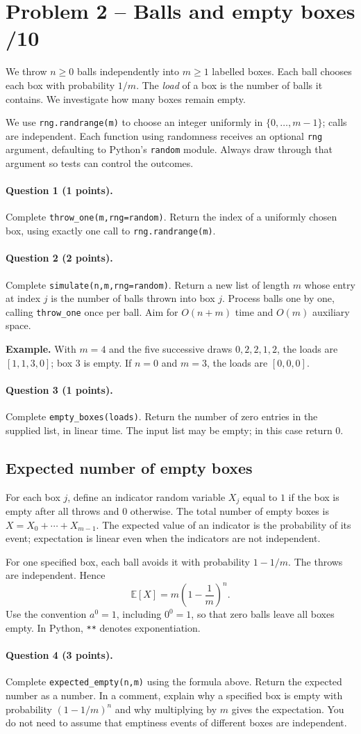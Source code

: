 \documentclass[11pt,a4paper]{article}
\newcommand{\q}[2]{\paragraph{Question #1 (#2 points).}}
\begin{document}
\section*{Problem 2 -- Balls and empty boxes \hfill /10}
We throw $n\ge0$ balls independently into $m\ge1$ labelled boxes. Each ball chooses each box with probability $1/m$. The \emph{load} of a box is the number of balls it contains. We investigate how many boxes remain empty.

We use \texttt{rng.randrange(m)} to choose an integer uniformly in $\{0,\ldots,m-1\}$; calls are independent. Each function using randomness receives an optional \texttt{rng} argument, defaulting to Python's \texttt{random} module. Always draw through that argument so tests can control the outcomes.
\q{1}{1} Complete \texttt{throw\_one(m,rng=random)}. Return the index of a uniformly chosen box, using exactly one call to \texttt{rng.randrange(m)}.
\q{2}{2} Complete \texttt{simulate(n,m,rng=random)}. Return a new list of length $m$ whose entry at index $j$ is the number of balls thrown into box $j$. Process balls one by one, calling \texttt{throw\_one} once per ball. Aim for $O(n+m)$ time and $O(m)$ auxiliary space.

\textbf{Example.} With $m=4$ and the five successive draws $0,2,2,1,2$, the loads are $[1,1,3,0]$; box $3$ is empty. If $n=0$ and $m=3$, the loads are $[0,0,0]$.
\q{3}{1} Complete \texttt{empty\_boxes(loads)}. Return the number of zero entries in the supplied list, in linear time. The input list may be empty; in this case return $0$.
\newpage
\subsection*{Expected number of empty boxes}
For each box $j$, define an indicator random variable $X_j$ equal to $1$ if the box is empty after all throws and $0$ otherwise. The total number of empty boxes is $X=X_0+\cdots+X_{m-1}$. The expected value of an indicator is the probability of its event; expectation is linear even when the indicators are not independent.

For one specified box, each ball avoids it with probability $1-1/m$. The throws are independent. Hence
\[
\mathbb{E}[X] = m\left(1-\frac{1}{m}\right)^n.
\]
Use the convention $a^0=1$, including $0^0=1$, so that zero balls leave all boxes empty. In Python, \texttt{**} denotes exponentiation.
\q{4}{3} Complete \texttt{expected\_empty(n,m)} using the formula above. Return the expected number as a number. In a comment, explain why a specified box is empty with probability $(1-1/m)^n$ and why multiplying by $m$ gives the expectation. You do not need to assume that emptiness events of different boxes are independent.
\end{document}
